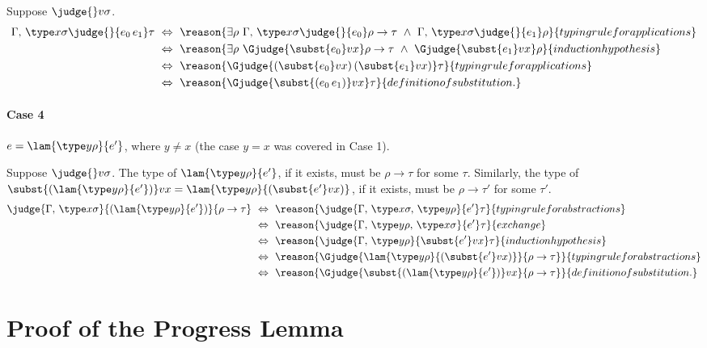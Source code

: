 Suppose $\judge{}v\sigma$.
\begin{align*}
\Gamma,\,\type x\sigma\judge{}{e_0\,e_1}\tau\
&\Leftrightarrow\ \reason{\exists\rho\ \Gamma,\,\type x\sigma\judge{}{e_0}\rho\to\tau\ \wedge\ \Gamma,\,\type x\sigma\judge{}{e_1}\rho}{typing rule for applications}\\
&\Leftrightarrow\ \reason{\exists\rho\ \Gjudge{\subst{e_0}vx}\rho\to\tau\ \wedge\ \Gjudge{\subst{e_1}vx}\rho}{induction hypothesis}\\
&\Leftrightarrow\ \reason{\Gjudge{(\subst{e_0}vx)\,(\subst{e_1}vx)}\tau}{typing rule for applications}\\
&\Leftrightarrow\ \reason{\Gjudge{\subst{(e_0\,e_1)}vx}\tau}{definition of substitution.}
\end{align*}

\paragraph{Case 4} $e = \lam{\type y\rho}{e'}$, where $y\neq x$ (the case $y=x$ was covered in Case 1).

Suppose $\judge{}v\sigma$. The type of $\lam{\type y\rho}{e'}$, if it exists, must be $\rho\to\tau$ for some $\tau$. Similarly, the type of $\subst{(\lam{\type y\rho}{e'})}vx=\lam{\type y\rho}{(\subst{e'}vx)}$, if it exists, must be $\rho\to\tau'$ for some $\tau'$.
\reasoning{\Gjudge{\subst{(\lam{\type y\rho}{e'})}vx}{\rho\to\tau}}
\begin{align*}
\judge{\Gamma,\,\type x\sigma}{(\lam{\type y\rho}{e'})}{\rho\to\tau}\
&\Leftrightarrow\ \reason{\judge{\Gamma,\,\type x\sigma,\,\type y\rho}{e'}\tau}{typing rule for abstractions}\\
&\Leftrightarrow\ \reason{\judge{\Gamma,\,\type y\rho,\,\type x\sigma}{e'}\tau}{exchange}\\
&\Leftrightarrow\ \reason{\judge{\Gamma,\,\type y\rho}{\subst{e'}vx}\tau}{induction hypothesis}\\
&\Leftrightarrow\ \reason{\Gjudge{\lam{\type y\rho}{(\subst{e'}vx)}}{\rho\to\tau}}{typing rule for abstractions}\\
&\Leftrightarrow\ \reason{\Gjudge{\subst{(\lam{\type y\rho}{e'})}vx}{\rho\to\tau}}{definition of substitution.}
\end{align*}

\section{Proof of the Progress Lemma}

